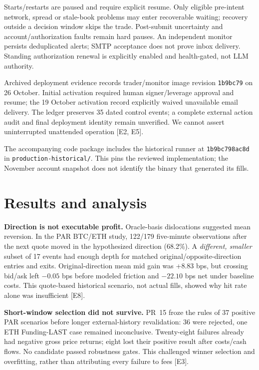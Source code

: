 \documentclass[a4paper]{article}
\begin{document}
Starts/restarts are paused and require explicit resume. Only eligible pre-intent network, spread or stale-book problems may enter recoverable waiting; recovery outside a decision window skips the trade. Post-submit uncertainty and account/authorization faults remain hard pauses. An independent monitor persists deduplicated alerts; SMTP acceptance does not prove inbox delivery. Standing authorization renewal is explicitly enabled and health-gated, not LLM authority.

Archived deployment evidence records trader/monitor image revision \texttt{1b9bc79} on 26 October. Initial activation required human signer/leverage approval and resume; the 19 October activation record explicitly waived unavailable email delivery. The ledger preserves 35 dated control events; a complete external action audit and final deployment identity remain unverified. We cannot assert uninterrupted unattended operation [E2, E5].

The accompanying code package includes the historical runner at \texttt{1b9bc798ac8d} in \texttt{production-historical/}. This pins the reviewed implementation; the November account snapshot does not identify the binary that generated its fills.
\newpage

\section{Results and analysis}
\textbf{Direction is not executable profit.} Oracle-basis dislocations suggested mean reversion. In the PAR BTC/ETH study, 122/179 five-minute observations after the next quote moved in the hypothesized direction (68.2\%). A \emph{different, smaller} subset of 17 events had enough depth for matched original/opposite-direction entries and exits. Original-direction mean mid gain was +8.83 bps, but crossing bid/ask left $-0.05$ bps before modeled friction and $-22.10$ bps net under baseline costs. This quote-based historical scenario, not actual fills, showed why hit rate alone was insufficient [E8].

\textbf{Short-window selection did not survive.} PR~15 froze the rules of 37 positive PAR scenarios before longer external-history revalidation: 36 were rejected, one ETH Funding-LAST case remained inconclusive. Twenty-eight failures already had negative gross price returns; eight lost their positive result after costs/cash flows. No candidate passed robustness gates. This challenged winner selection and overfitting, rather than attributing every failure to fees [E3].
\end{document}
